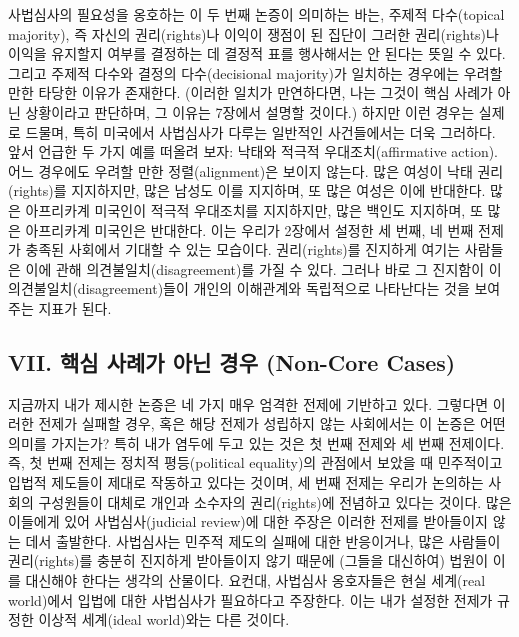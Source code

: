 \documentclass[a4paper,12pt,oneside]{article}  %
\begin{document}
사법심사의 필요성을 옹호하는 이 두 번째 논증이 의미하는 바는, 주제적
다수(topical majority), 즉 자신의 권리(rights)나 이익이 쟁점이 된 집단이
그러한 권리(rights)나 이익을 유지할지 여부를 결정하는 데 결정적 표를
행사해서는 안 된다는 뜻일 수 있다. 그리고 주제적 다수와 결정의
다수(decisional majority)가 일치하는 경우에는 우려할 만한 타당한 이유가
존재한다. (이러한 일치가 만연하다면, 나는 그것이 핵심 사례가 아닌
상황이라고 판단하며, 그 이유는 7장에서 설명할 것이다.) 하지만 이런
경우는 실제로 드물며, 특히 미국에서 사법심사가 다루는 일반적인
사건들에서는 더욱 그러하다. 앞서 언급한 두 가지 예를 떠올려 보자: 낙태와
적극적 우대조치(affirmative action). 어느 경우에도 우려할 만한
정렬(alignment)은 보이지 않는다. 많은 여성이 낙태 권리(rights)를
지지하지만, 많은 남성도 이를 지지하며, 또 많은 여성은 이에 반대한다.
많은 아프리카계 미국인이 적극적 우대조치를 지지하지만, 많은 백인도
지지하며, 또 많은 아프리카계 미국인은 반대한다. 이는 우리가 2장에서
설정한 세 번째, 네 번째 전제가 충족된 사회에서 기대할 수 있는 모습이다.
권리(rights)를 진지하게 여기는 사람들은 이에 관해
의견불일치(disagreement)를 가질 수 있다. 그러나 바로 그 진지함이 이
의견불일치(disagreement)들이 개인의 이해관계와 독립적으로 나타난다는
것을 보여주는 지표가 된다.

\subsection{VII. 핵심 사례가 아닌 경우 (Non-Core
Cases)}\label{vii.-uxd575uxc2ec-uxc0acuxb840uxac00-uxc544uxb2cc-uxacbduxc6b0-non-core-cases}

지금까지 내가 제시한 논증은 네 가지 매우 엄격한 전제에 기반하고 있다.
그렇다면 이러한 전제가 실패할 경우, 혹은 해당 전제가 성립하지 않는
사회에서는 이 논증은 어떤 의미를 가지는가? 특히 내가 염두에 두고 있는
것은 첫 번째 전제와 세 번째 전제이다. 즉, 첫 번째 전제는 정치적
평등(political equality)의 관점에서 보았을 때 민주적이고 입법적 제도들이
제대로 작동하고 있다는 것이며, 세 번째 전제는 우리가 논의하는 사회의
구성원들이 대체로 개인과 소수자의 권리(rights)에 전념하고 있다는 것이다.
많은 이들에게 있어 사법심사(judicial review)에 대한 주장은 이러한 전제를
받아들이지 않는 데서 출발한다. 사법심사는 민주적 제도의 실패에 대한
반응이거나, 많은 사람들이 권리(rights)를 충분히 진지하게 받아들이지 않기
때문에 (그들을 대신하여) 법원이 이를 대신해야 한다는 생각의 산물이다.
요컨대, 사법심사 옹호자들은 현실 세계(real world)에서 입법에 대한
사법심사가 필요하다고 주장한다. 이는 내가 설정한 전제가 규정한 이상적
세계(ideal world)와는 다른 것이다.
\end{document}
